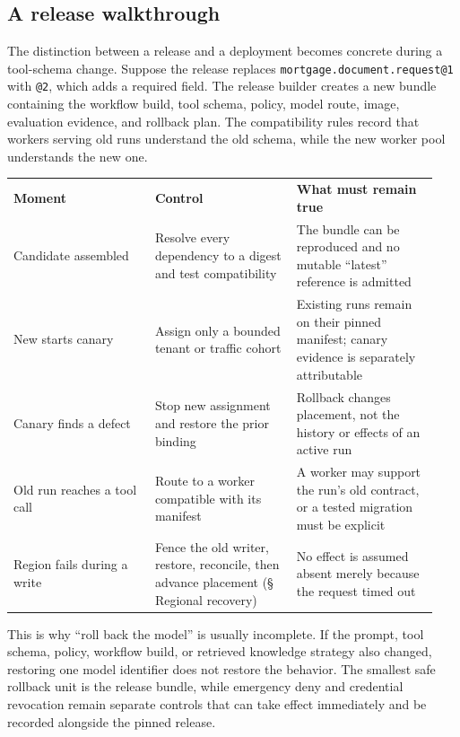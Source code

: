 \subsection{A release walkthrough}

The distinction between a release and a deployment becomes concrete during a tool-schema change. Suppose the release replaces \lstinline[style=bookinline]!mortgage.document.request@1! with \lstinline[style=bookinline]!@2!, which adds a required field. The release builder creates a new bundle containing the workflow build, tool schema, policy, model route, image, evaluation evidence, and rollback plan. The compatibility rules record that workers serving old runs understand the old schema, while the new worker pool understands the new one.\par

\BookTableStart
\small
\begin{tabular}{@{}Y{0.3133\linewidth}Y{0.3133\linewidth}Y{0.3133\linewidth}@{}}
\color{white}\bfseries \textbf{Moment} & \color{white}\bfseries \textbf{Control} & \color{white}\bfseries \textbf{What must remain true} \\
Candidate assembled & Resolve every dependency to a digest and test compatibility & The bundle can be reproduced and no mutable “latest” reference is admitted \\
New starts canary & Assign only a bounded tenant or traffic cohort & Existing runs remain on their pinned manifest; canary evidence is separately attributable \\
Canary finds a defect & Stop new assignment and restore the prior binding & Rollback changes placement, not the history or effects of an active run \\
Old run reaches a tool call & Route to a worker compatible with its manifest & A worker may support the run’s old contract, or a tested migration must be explicit \\
Region fails during a write & Fence the old writer, restore, reconcile, then advance placement (§ Regional recovery) & No effect is assumed absent merely because the request timed out \\
\end{tabular}
\BookTableEnd

This is why “roll back the model” is usually incomplete. If the prompt, tool schema, policy, workflow build, or retrieved knowledge strategy also changed, restoring one model identifier does not restore the behavior. The smallest safe rollback unit is the release bundle, while emergency deny and credential revocation remain separate controls that can take effect immediately and be recorded alongside the pinned release.\par

